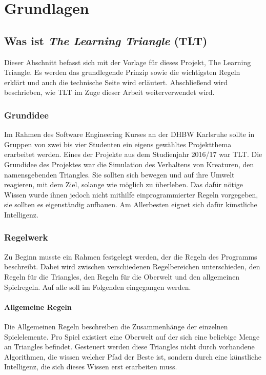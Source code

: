 \chapter{Grundlagen}

\section{Was ist \textit{The Learning Triangle} (TLT)}

Dieser Abschnitt befasst sich mit der Vorlage für dieses Projekt, The Learning Triangle. Es werden das grundlegende Prinzip sowie die wichtigsten Regeln erklärt und auch die technische Seite wird erläutert. Abschließend wird beschrieben, wie TLT im Zuge dieser Arbeit weiterverwendet wird. 

\subsection{Grundidee}

Im Rahmen des Software Engineering Kurses an der DHBW Karlsruhe sollte in Gruppen von zwei bis vier Studenten ein eigens gewähltes Projektthema erarbeitet werden. Eines der Projekte aus dem Studienjahr 2016/17 war TLT. Die Grundidee des Projektes war die Simulation des Verhaltens von Kreaturen, den namensgebenden \grqq Triangles\glqq{}. Sie sollten sich bewegen und auf ihre Umwelt reagieren, mit dem Ziel, solange wie möglich zu überleben. Das dafür nötige Wissen wurde ihnen jedoch nicht mithilfe einprogrammierter Regeln vorgegeben, sie sollten es eigenständig aufbauen. Am Allerbesten eignet sich dafür künstliche Intelligenz. 

\subsection{Regelwerk}

Zu Beginn musste ein Rahmen festgelegt werden, der die Regeln des Programms beschreibt. Dabei wird zwischen verschiedenen Regelbereichen unterschieden, den Regeln für die Triangles, den Regeln für die Oberwelt und den allgemeinen Spielregeln. Auf alle soll im Folgenden eingegangen werden.

\subsubsection{Allgemeine Regeln}

Die Allgemeinen Regeln beschreiben die Zusammenhänge der einzelnen Spielelemente. Pro Spiel existiert eine Oberwelt auf der sich eine beliebige Menge an Triangles befindet. Gesteuert werden diese Triangles nicht durch vorhandene Algorithmen, die wissen welcher Pfad der Beste ist, sondern durch eine künstliche Intelligenz, die sich dieses Wissen erst erarbeiten muss. 

